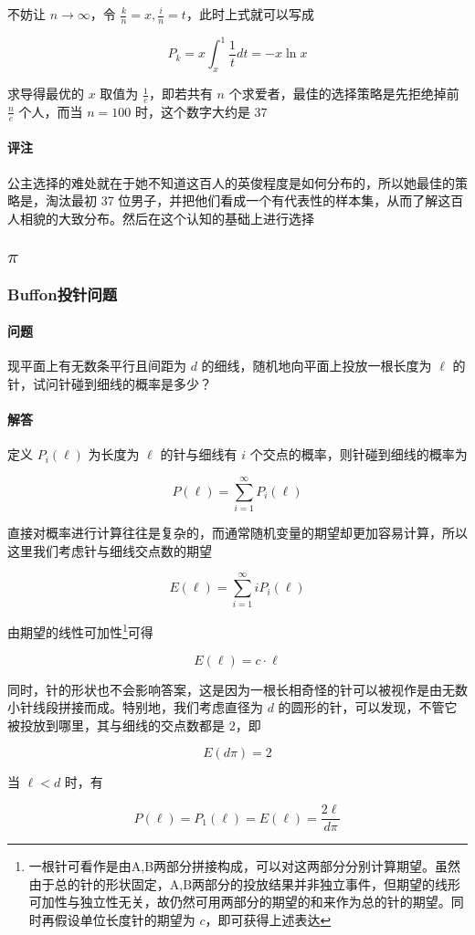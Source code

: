 \documentclass[a4paper, 11pt]{article} %
\begin{document}
不妨让 $n\to\infty$，令 $\frac{k}{n}=x,\frac{i}{n}=t$，此时上式就可以写成

$$
P_k=x\int_x^1\frac{1}{t}dt=-x\ln{x}
$$

求导得最优的 $x$ 取值为 $\frac{1}{e}$，即若共有 $n$ 个求爱者，最佳的选择策略是先拒绝掉前 $\frac{n}{e}$ 个人，而当 $n=100$ 时，这个数字大约是 $37$

\paragraph{评注}

公主选择的难处就在于她不知道这百人的英俊程度是如何分布的，所以她最佳的策略是，淘汰最初 37 位男子，并把他们看成一个有代表性的样本集，从而了解这百人相貌的大致分布。然后在这个认知的基础上进行选择

\subsection{$\pi$}

\subsubsection{Buffon投针问题}

\paragraph{问题}

现平面上有无数条平行且间距为 $d$ 的细线，随机地向平面上投放一根长度为 $\ell$ 的针，试问针碰到细线的概率是多少？



\paragraph{解答}

定义 $P_i(\ell)$ 为长度为 $\ell$ 的针与细线有 $i$ 个交点的概率，则针碰到细线的概率为 

$$
P(\ell)=\sum\limits_{i=1}^\infty P_i(\ell)
$$

直接对概率进行计算往往是复杂的，而通常随机变量的期望却更加容易计算，所以这里我们考虑针与细线交点数的期望 

$$
E(\ell)=\sum\limits_{i=1}^\infty iP_i(\ell)
$$

由期望的线性可加性\footnote{一根针可看作是由A,B两部分拼接构成，可以对这两部分分别计算期望。虽然由于总的针的形状固定，A,B两部分的投放结果并非独立事件，但期望的线形可加性与独立性无关，故仍然可用两部分的期望的和来作为总的针的期望。同时再假设单位长度针的期望为 $c$，即可获得上述表达}可得

$$
E(\ell)=c\cdot\ell
$$

同时，针的形状也不会影响答案，这是因为一根长相奇怪的针可以被视作是由无数小针线段拼接而成。特别地，我们考虑直径为 $d$ 的圆形的针，可以发现，不管它被投放到哪里，其与细线的交点数都是 $2$，即

$$
E(d\pi)=2
$$

当 $\ell<d$ 时，有 

$$
P(\ell)=P_1(\ell)=E(\ell)=\frac{2\ell}{d\pi}
$$
\end{document}
